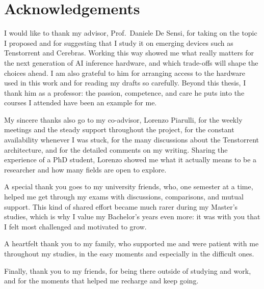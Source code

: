 \chapter*{Acknowledgements}


I would like to thank my advisor, Prof.\ Daniele De Sensi, for taking on the
topic I proposed and for suggesting that I study it on emerging devices such as
Tenstorrent and Cerebras. Working this way showed me what really matters for
the next generation of AI inference hardware, and which trade-offs will shape
the choices ahead. I am also grateful to him for arranging access to the
hardware used in this work and for reading my drafts so carefully. Beyond this
thesis, I thank him as a professor: the passion, competence, and care he puts
into the courses I attended have been an example for me.

My sincere thanks also go to my co-advisor, Lorenzo Piarulli, for the weekly meetings
and the steady support throughout the project, for the constant availability
whenever I was stuck, for the many discussions about the Tenstorrent architecture, and
for the detailed comments on my writing. Sharing the experience of a PhD
student, Lorenzo showed me what it actually means to be a researcher and how
many fields are open to explore.

A special thank you goes to my university friends, who, one semester at a
time, helped me get through my exams with discussions, comparisons, and mutual
support. This kind of shared effort became much rarer during my Master's
studies, which is why I value my Bachelor's years even more: it was with you
that I felt most challenged and motivated to grow.

A heartfelt thank you to my family, who supported me and were patient with me
throughout my studies, in the easy moments and especially in the difficult
ones.

Finally, thank you to my friends, for being there outside of studying and
work, and for the moments that helped me recharge and keep going.
